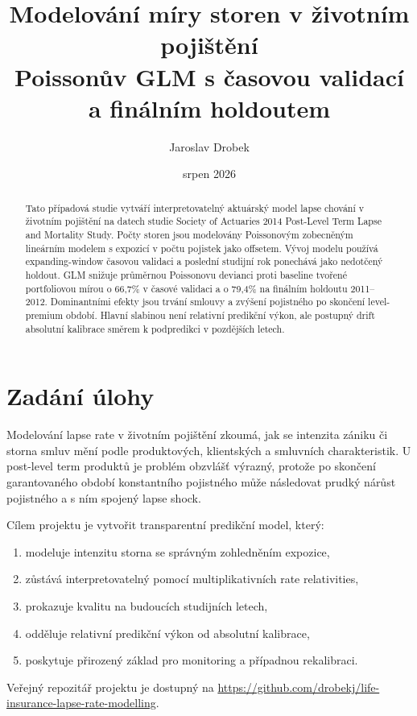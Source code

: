 \documentclass[11pt,a4paper]{article}
\title{\vspace{-1cm}\textbf{Modelování míry storen v životním pojištění}\\\large Poissonův GLM s časovou validací a finálním holdoutem}
\author{Jaroslav Drobek}
\date{srpen 2026}
\theoremstyle{definition}
\begin{document}
\maketitle

\begin{abstract}
Tato případová studie vytváří interpretovatelný aktuárský model lapse chování v životním pojištění na datech studie Society of Actuaries 2014 Post-Level Term Lapse and Mortality Study. Počty storen jsou modelovány Poissonovým zobecněným lineárním modelem s expozicí v počtu pojistek jako offsetem. Vývoj modelu používá expanding-window časovou validaci a poslední studijní rok ponechává jako nedotčený holdout. GLM snižuje průměrnou Poissonovu devianci proti baseline tvořené portfoliovou mírou o 66,7\% v časové validaci a o 79,4\% na finálním holdoutu 2011--2012. Dominantními efekty jsou trvání smlouvy a zvýšení pojistného po skončení level-premium období. Hlavní slabinou není relativní predikční výkon, ale postupný drift absolutní kalibrace směrem k podpredikci v pozdějších letech.
\end{abstract}

\tableofcontents
\newpage

\section{Zadání úlohy}
Modelování lapse rate v životním pojištění zkoumá, jak se intenzita zániku či storna smluv mění podle produktových, klientských a smluvních charakteristik. U post-level term produktů je problém obzvlášť výrazný, protože po skončení garantovaného období konstantního pojistného může následovat prudký nárůst pojistného a s ním spojený lapse shock.

Cílem projektu je vytvořit transparentní predikční model, který:
\begin{enumerate}
\item modeluje intenzitu storna se správným zohledněním expozice,
\item zůstává interpretovatelný pomocí multiplikativních rate relativities,
\item prokazuje kvalitu na budoucích studijních letech,
\item odděluje relativní predikční výkon od absolutní kalibrace,
\item poskytuje přirozený základ pro monitoring a případnou rekalibraci.
\end{enumerate}

Veřejný repozitář projektu je dostupný na \url{https://github.com/drobekj/life-insurance-lapse-rate-modelling}.
\end{document}

